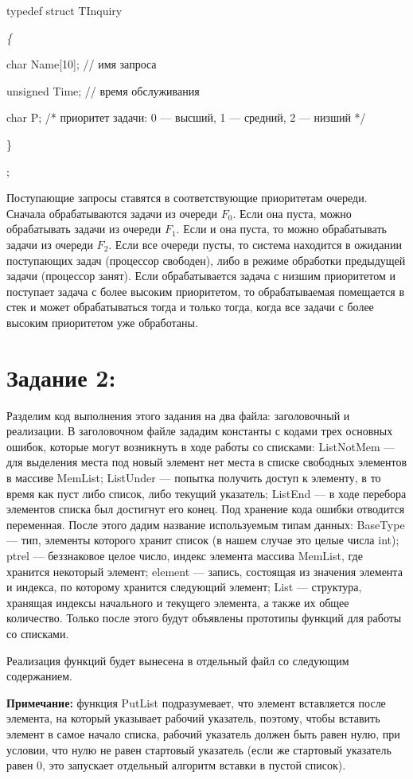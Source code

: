 \documentclass[12pt]{article}
\begin{document}
{	typedef struct TInquiry
	
	{\it \{  
		
		char Name[10]; // имя запроса
		
		unsigned Time; // время обслуживания
		
		char P; /* приоритет задачи: 0 — высший, 1 — средний, 2 — низший */
		
	\}};	
	
	Поступающие запросы ставятся в соответствующие приоритетам очереди. Сначала обрабатываются задачи из очереди $F_0$. Если она пуста, можно обрабатывать задачи из очереди $F_1$. Если и она пуста, то можно обрабатывать задачи из очереди $F_2$. Если все очереди пусты, то система находится в ожидании поступающих задач (процессор свободен), либо в режиме обработки предыдущей задачи (процессор занят). Если обрабатывается задача с низшим приоритетом и поступает задача с более высоким приоритетом, то обрабатываемая помещается в стек и может обрабатываться тогда и только тогда, когда все задачи с более высоким приоритетом уже обработаны.
	
	\section{Задание 2:}
	\label{task_2}
	
	Разделим код выполнения этого задания на два файла: заголовочный и  реализации. В заголовочном файле зададим константы с кодами трех основных ошибок, которые могут возникнуть в ходе работы со списками: ListNotMem --- для выделения места под новый элемент нет места в списке свободных элементов в массиве MemList; ListUnder --- попытка получить доступ к элементу, в то время как пуст либо список, либо текущий указатель; ListEnd --- в ходе перебора элементов списка был достигнут его конец. Под хранение кода ошибки отводится переменная. После этого дадим название используемым типам данных: BaseType --- тип, элементы которого хранит список (в нашем случае это целые числа int); ptrel --- беззнаковое целое число, индекс элемента массива MemList, где хранится некоторый элемент; element --- запись, состоящая из значения элемента и индекса, по которому хранится следующий элемент; List --- структура, хранящая индексы начального и текущего элемента, а также их общее количество. Только после этого будут объявлены прототипы функций для работы со списками. 
	
	Реализация функций будет вынесена в отдельный файл со следующим содержанием.
	
	{\bf Примечание:} функция PutList подразумевает, что элемент вставляется после элемента, на который указывает рабочий указатель, поэтому, чтобы вставить элемент в самое начало списка, рабочий указатель должен быть равен нулю, при условии, что нулю не равен стартовый указатель (если же стартовый указатель равен 0, это запускает отдельный алгоритм вставки в пустой список).
	

}
\end{document}
